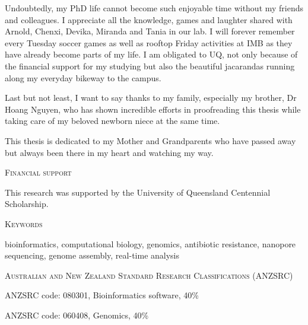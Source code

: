 \vspace{.3cm}

Undoubtedly, my PhD life cannot become such enjoyable time without my friends and colleagues. I appreciate all the knowledge, games and laughter shared with Arnold, Chenxi, Devika, Miranda and Tania in our lab. I will forever remember every Tuesday soccer games as well as rooftop Friday activities at IMB as they have already become parts of my life. I am obligated to UQ, not only because of the financial support for my studying but also the beautiful jacarandas running along my everyday bikeway to the campus. 

\vspace{.3cm}

Last but not least, I want to say thanks to my family, especially my brother, Dr Hoang Nguyen, who has shown incredible efforts in proofreading this thesis while taking care of my beloved newborn niece at the same time.

\vspace{.3cm}

This thesis is dedicated to my Mother and Grandparents who have passed away but always been there in my heart and watching my way.  

\afterpage{\null\thispagestyle{empty}\newpage}
\newpage


\thispagestyle{plain}

\begin{center}
\Large \textsc{Financial support}
\end{center}

This research was supported by the University of Queensland Centennial Scholarship.

\vspace{2cm}
\begin{center}
\Large \textsc{Keywords}
\end{center}

bioinformatics, computational biology, genomics, antibiotic resistance, nanopore sequencing, genome assembly, real-time analysis

\vspace{2cm}
\begin{center}
\Large \textsc{Australian and New Zealand Standard Research Classifications (ANZSRC)}
\end{center}

ANZSRC code: 080301, Bioinformatics software, 40\%

ANZSRC code: 060408, Genomics, 40\%

